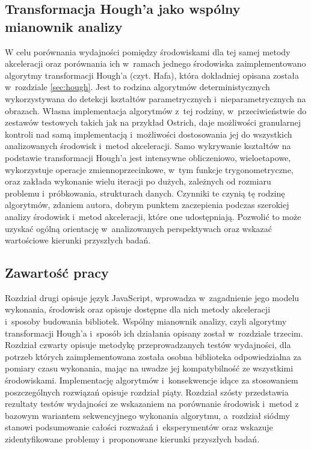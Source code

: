 \subsection{Transformacja Hough'a jako wspólny mianownik analizy}

W celu porównania wydajności pomiędzy środowiskami dla tej samej metody akceleracji oraz porównania ich w~ramach jednego środowiska zaimplementowano algorytmy transformacji Hough'a (czyt. Hafa), która dokładniej opisana została w~rozdziale \ref{sec:hough}. Jest to rodzina algorytmów deterministycznych wykorzystywana do detekcji kształtów parametrycznych i~nieparametrycznych na obrazach.  Własna implementacja algorytmów z~tej rodziny, w~przeciwieństwie do zestawów testowych takich jak na przykład Ostrich\cite{ostrich}, daje możliwości granularnej kontroli nad samą implementacją i~możliwości dostosowania jej do wszystkich analizowanych środowisk i~metod akceleracji. Samo wykrywanie kształtów na podstawie transformacji Hough'a jest intensywne obliczeniowo, wieloetapowe, wykorzystuje operacje zmiennoprzecinkowe, w~tym funkcje trygonometryczne, oraz zakłada wykonanie wielu iteracji po dużych, zależnych od rozmiaru problemu i~próbkowania, strukturach danych. Czynniki te czynią tę rodzinę algorytmów, zdaniem autora, dobrym punktem zaczepienia podczas szerokiej analizy środowisk i~metod akceleracji, które one udostępniają. Pozwolić to może uzyskać ogólną orientację w~analizowanych perspektywach oraz wskazać wartościowe kierunki przyszłych badań. 

\subsection{Zawartość pracy}

Rozdział drugi opisuje język JavaScript, wprowadza w~zagadnienie jego modelu wykonania, środowisk oraz opisuje dostępne dla nich metody akceleracji i~sposoby budowania bibliotek. Wspólny mianownik analizy, czyli algorytmy transformacji Hough'a i~sposób ich działania opisany został w~rozdziale trzecim. Rozdział czwarty opisuje metodykę przeprowadzanych testów wydajności, dla potrzeb których zaimplementowana została osobna biblioteka odpowiedzialna za pomiary czasu wykonania, mając na uwadze jej kompatybilność ze wszystkimi środowiskami. Implementację algorytmów i~konsekwencje idące za stosowaniem poszczególnych rozwiązań opisuje rozdział piąty. Rozdział szósty przedstawia rezultaty testów wydajności ze wskazaniem na porównanie środowisk i~metod z bazowym wariantem sekwencyjnego wykonania algorytmu, a~rozdział siódmy stanowi podsumowanie całości rozważań i~eksperymentów oraz wskazuje zidentyfikowane problemy i~proponowane kierunki przyszłych badań.
